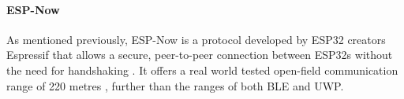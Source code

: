 \documentclass[12pt, a4paper]{report}
\begin{document}
{

\paragraph{ESP-Now}

As mentioned previously, ESP-Now is a protocol developed by ESP32 creators Espressif that allows a secure, peer-to-peer connection between ESP32s without the need for handshaking \cite{esp-now_overview}. It offers a real world tested open-field communication range of 220 metres \cite{random_nerd_tutorials}, further than the ranges of both BLE and UWP.



\printbibliography

}
\end{document}
